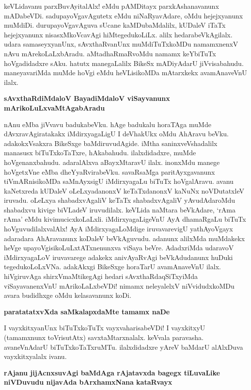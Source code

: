 \noindent
keVLidavanu parxBuvAyitalAlx! eMdu pAMDitayx parxkAshanavanunx mADabeVDi. sadupayoVgavAgutetx eMdu niNaRyavAdare, oMdu hejejxyanunx muMdiDi. durupayoVgavAguva sUcane kaMDu\-baMdalilx, kUDaleV iTaTx hejejxyanunx nisasxMkoVcavAgi hiMtegedukoLiLx. alilx hedarabeVkAgilalx. udara samaseyx\-yanUnx, sAvxthaRvanUnx muMdiTuTxkoMDu namamxnenxV nAvu mArekoLaLxbAradu. aMtadhaRmaRvoMdu namamx keYbiTuTx hoVgadidadxre sAku. hatutx manegaLalilx BikeSx mADiyAdarU jiVvisabahudu. maneyava\-riMda muMde hoVgi eMdu heVLisikoMDa mAtarxkekx avamAnaveVnU ilalx.

{\bigskip
\noindent
{\large\bf sAvxthaRdiMdaloV BayadiMdaloV viSayvanunx mArikoLuLxvaMtAga\break\-bAradu}}\label{page252}
\medskip

\noindent
nAnu eMba jiVvavu badukabeVku. hAge badukalu horaTAga muMde dAvxravAgiratakakx iMdirxya\-gaLigU I deVhakUkx oMdu AhAravu beVku. adakokxVsakxra BikeSxge baMdiruvudAgide. iMtha saninx\-veVshadalilx manasusx biTuTxkoTaTxre, hAkabahudu. ilalxdidadxre, muMde hoVgenanxbahudu. adaralAlxva aBayxMtaravU\- ilalx. inonxMdu manege hoVgetxVne eMba dheYyaRvirabeVku. savaRsaMga paritAyxga\-vanunx tiVmAR\-nisi\-koMDa saMnAyxsigU iMdirxyagaLu biTuTx hoVgalAravu. avanu kaNetxreda kUDaleV oLeLxyadanonxV keTaTx\-danonxV kaNuNx noVDutatxleV iruvadu. oLeLxya shabadxvAgaliV keTaTx shabadxvAgaliV yAvudAdaroMdu shabadxvu kivige biVLadeV iruvudilalx. keVLida naMtara beVkAdare, `rAma rAma' eMdu kivimucicxkoLaLxli. iMdirxyagaLigeVnU AyA dhamaRgaLu biTuTx hoVguvudilalxvalAlx! AyA iMdirxyagaLoMdige iruva\-varevigU yathAyoVgayx adaradara AhAravanunx koDaleV beVkAguvudu. adanunx alilxMda muMdakekx heVge upayoVgisikoLuLxtATxnenunxva viSaya beVre. AdadxriMda udaravoV iMdirxyagaLoV iruvavarege adakekx anivAyaRvAgi beVkAdudanunx huDuki tegedukoLoLxVNa. adakAkxgi BikeSxge horaTarU ava\-mAna\-veVnU ilalx. hiVgiruvAga shirxVmaMtikegAgi hedari sAvxthaRdaqSiTxyiMda viSayavanenxVnU mArikoLaLxbeVDi! nimamx neleyalelxV niVvidudxkoMDu avara budidhxge oMdu kelasavanunx koDi.

{\bigskip
\noindent
{\large\bf paratatatxvXda saMkalapxdaMte tamamx naDe}}\label{page253}
\medskip

\noindent
I vayxkitxyanUnx biTuTxkoTuTx vayxvaharisabeVDi! I vayxkitxyU (tamamxnunx toVrisutAtx) savxtaMtarx\-nalalx. keVvala paravasha. avaneVnAdarU biTuTxkoTaTxruMTu. ilalxdidadxre yAreV baMdarU alAlxDuva vayxkitx\-yalalx ivanu.

{\bigskip
\noindent
{\large\bf rAjanu jijAcnxsuvAgi baMdAga rAjatavxda bagegx tiLuvaLike niVDuvudu nijavAda bArxhamxNana kataRvayx}}
\medskip

